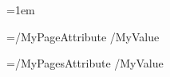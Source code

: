 




\pdfhorigin=1in         %

\pdfvorigin=1in         %


\pdfpagewidth=8.5in     %
\pdfpageheight=11in

\pdflinkmargin=1pt      %

\pdfdestmargin=10pt     %

\pdfthreadmargin=1em    %


\pdfpagesattr={/MyPageAttribute /MyValue}

\pdfpageattr={/MyPagesAttribute /MyValue}

